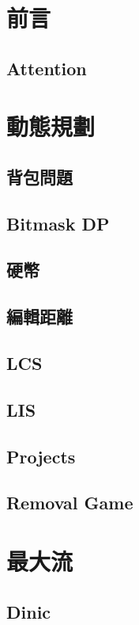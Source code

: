 \section{前言}
\subsection{Attention}


\section{動態規劃}
\subsection{背包問題} 

\subsection{Bitmask DP} 

\subsection{硬幣} 

\subsection{編輯距離} 

\subsection{LCS} 

\subsection{LIS} 

\subsection{Projects} 

\subsection{Removal Game} 


\section{最大流}
\subsection{Dinic} 

